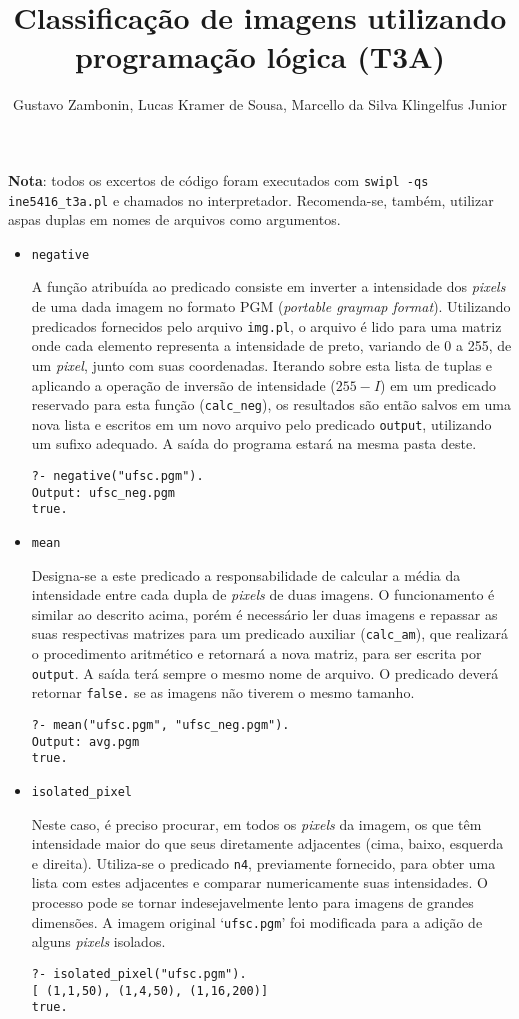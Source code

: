 \documentclass{../sftex/sftex}
\title{Classificação de imagens utilizando programação lógica (T3A)}
\author{Gustavo Zambonin, Lucas Kramer de Sousa,
    Marcello da Silva Klingelfus Junior}
\begin{document}
\maketitle

\textbf{Nota}: todos os excertos de código foram executados com
\verb!swipl -qs ine5416_t3a.pl! e chamados no interpretador. Recomenda-se,
também, utilizar aspas duplas em nomes de arquivos como argumentos.

\begin{itemize}

\item \verb!negative!

A função atribuída ao predicado consiste em inverter a intensidade dos
\emph{pixels} de uma dada imagem no formato PGM (\emph{portable graymap
format}). Utilizando predicados fornecidos pelo arquivo \verb!img.pl!,
o arquivo é lido para uma matriz onde cada elemento representa a intensidade
de preto, variando de 0 a 255, de um \emph{pixel}, junto com suas
coordenadas. Iterando sobre esta lista de tuplas e aplicando a operação de
inversão de intensidade ($255 - I$) em um predicado reservado para esta função
(\verb!calc_neg!), os resultados são então salvos em uma nova lista e
escritos em um novo arquivo pelo predicado \verb!output!, utilizando um
sufixo adequado. A saída do programa estará na mesma pasta deste.
\begin{verbatim}
?- negative("ufsc.pgm").
Output: ufsc_neg.pgm
true.
\end{verbatim}

\item \verb!mean!

Designa-se a este predicado a responsabilidade de calcular a média da
intensidade entre cada dupla de \emph{pixels} de duas imagens. O funcionamento
é similar ao descrito acima, porém é necessário ler duas imagens e repassar as
suas respectivas matrizes para um predicado auxiliar (\verb!calc_am!), que
realizará o procedimento aritmético e retornará a nova matriz, para ser escrita
por \verb!output!. A saída terá sempre o mesmo nome de arquivo. O predicado
deverá retornar \verb!false.! se as imagens não tiverem o mesmo tamanho.
\begin{verbatim}
?- mean("ufsc.pgm", "ufsc_neg.pgm").
Output: avg.pgm
true.
\end{verbatim}

\item \verb!isolated_pixel!

Neste caso, é preciso procurar, em todos os \emph{pixels} da imagem, os que
têm intensidade maior do que seus diretamente adjacentes (cima, baixo,
esquerda e direita). Utiliza-se o predicado \verb!n4!, previamente fornecido,
para obter uma lista com estes adjacentes e comparar numericamente suas
intensidades. O processo pode se tornar indesejavelmente lento para imagens
de grandes dimensões. A imagem original `\verb!ufsc.pgm!' foi modificada para
a adição de alguns \emph{pixels} isolados.
\begin{verbatim}
?- isolated_pixel("ufsc.pgm").
[ (1,1,50), (1,4,50), (1,16,200)]
true.
\end{verbatim}


\end{itemize}
\end{document}
